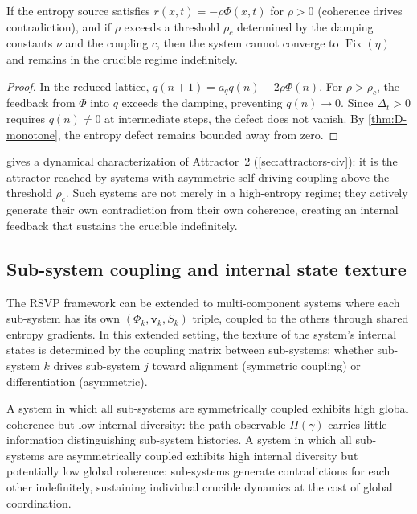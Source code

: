 \documentclass[12pt, oneside]{memoir}
\DeclareMathOperator{\Fix}{Fix}
\newcommand{\bv}{\mathbf{v}}
\newcommand{\aq}{a_q}
\begin{document}
\begin{proposition}
\label{prop:asym-coupling}
If the entropy source satisfies $r(x,t) = -\rho \Phi(x,t)$ for $\rho > 0$ (coherence
drives contradiction), and if $\rho$ exceeds a threshold $\rho_c$ determined by the
damping constants $\nu$ and the coupling $c$, then the system cannot converge to
$\Fix(\eta)$ and remains in the crucible regime indefinitely.
\end{proposition}

\begin{proof}
In the reduced lattice, $q(n+1) = \aq q(n) - 2\rho \Phi(n)$.  For $\rho > \rho_c$, the
feedback from $\Phi$ into $q$ exceeds the damping, preventing $q(n) \to 0$.  Since
$\Delta_t > 0$ requires $q(n) \neq 0$ at intermediate steps, the defect does not vanish.
By \cref{thm:D-monotone}, the entropy defect remains bounded away from zero.
\end{proof}

 gives a dynamical characterization of Attractor~2
(\cref{sec:attractors-civ}): it is the attractor reached by systems with asymmetric
self-driving coupling above the threshold $\rho_c$.  Such systems are not merely in a
high-entropy regime; they actively generate their own contradiction from their own
coherence, creating an internal feedback that sustains the crucible indefinitely.

\subsection{Sub-system coupling and internal state texture}

The RSVP framework can be extended to multi-component systems where each sub-system has
its own $(\Phi_k, \bv_k, S_k)$ triple, coupled to the others through shared entropy
gradients.  In this extended setting, the texture of the system's internal states is
determined by the coupling matrix between sub-systems: whether sub-system $k$ drives
sub-system $j$ toward alignment (symmetric coupling) or differentiation (asymmetric).

A system in which all sub-systems are symmetrically coupled exhibits high global
coherence but low internal diversity: the path observable $\Pi(\gamma)$ carries little
information distinguishing sub-system histories.  A system in which all sub-systems are
asymmetrically coupled exhibits high internal diversity but potentially low global
coherence: sub-systems generate contradictions for each other indefinitely, sustaining
individual crucible dynamics at the cost of global coordination.
\end{document}
